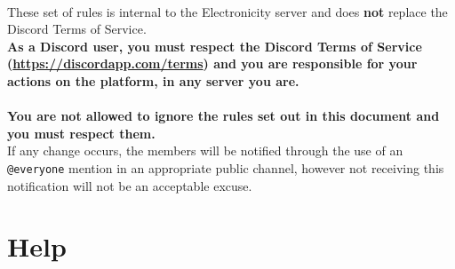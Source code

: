 \documentclass[a4paper]{article}
\begin{document}
\\
These set of rules is internal to the Electronicity server and does \textbf{not} replace the Discord Terms of Service.\\
\textbf{As a Discord user, you must respect the Discord Terms of Service (\url{https://discordapp.com/terms}) and you are responsible for your actions on the platform, in any server you are.}\\
\\
\textbf{You are not allowed to ignore the rules set out in this document and you must respect them.}\\
If any change occurs, the members will be notified through the use of an \texttt{@everyone} mention in an appropriate public channel, however not receiving this notification will not be an acceptable excuse.
\pagebreak

\section{Help}
\end{document}
